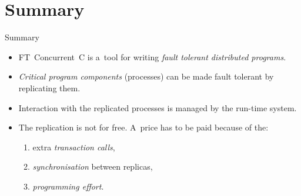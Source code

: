 \documentclass[
    10pt, hyperref={unicode, colorlinks, hypertexnames=false,
    linkcolor=white}, aspectratio=169
]{beamer}
\begin{document}
\section{Summary}
\begin{frame}{Summary}
    \begin{itemize}\setlength\itemsep{2em}
        \item
            \alert{FT~Concurrent~C} is a~tool for writing \emph{fault tolerant
            distributed programs}.

        \item
            \emph{Critical program components} (processes) can be made fault
            tolerant by \alert{replicating} them.

        \item
            Interaction with the replicated processes is managed by the
            \alert{run-time system}.

        \item
            The replication is \alert{not for free}. A~price has to be paid because of the:

            \begin{enumerate}\setlength\itemsep{.5em}
                \item
                    extra \emph{transaction calls},

                \item
                    \emph{synchronisation} between replicas,

                \item
                    \emph{programming effort}.
            \end{enumerate}
    \end{itemize}
\end{frame}
\end{document}
